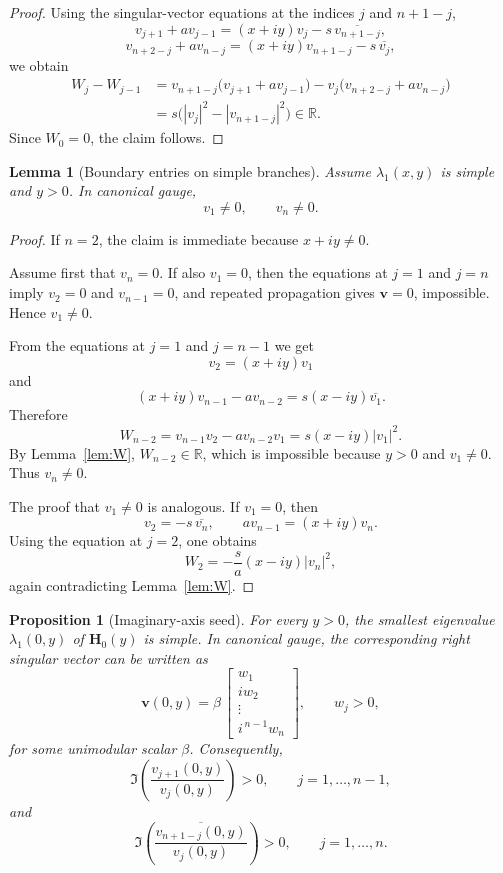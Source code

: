 \documentclass[11pt]{article}
\numberwithin{equation}{section}
\newtheorem{proposition}[theorem]{Proposition}
\newtheorem{lemma}[theorem]{Lemma}
\newcommand{\R}{\mathbb R}
\newcommand{\Hmat}{\mathbf H}
\begin{document}
\begin{proof}
Using the singular-vector equations at the indices \(j\) and \(n+1-j\),
\[
v_{j+1}+av_{j-1}=(x+iy)v_j-s\,\overline{v_{n+1-j}},
\]
\[
v_{n+2-j}+av_{n-j}=(x+iy)v_{n+1-j}-s\,\overline{v_j},
\]
we obtain
\begin{align*}
W_j-W_{j-1}
&=
v_{n+1-j}\bigl(v_{j+1}+av_{j-1}\bigr)
-
v_j\bigl(v_{n+2-j}+av_{n-j}\bigr) \\
&=
s\bigl(|v_j|^2-|v_{n+1-j}|^2\bigr)\in\R.
\end{align*}
Since \(W_0=0\), the claim follows.
\end{proof}

\begin{lemma}[Boundary entries on simple branches]\label{lem:boundary}
Assume \(\lambda_1(x,y)\) is simple and \(y>0\).  In canonical gauge,
\[
v_1\neq0,
\qquad
v_n\neq0.
\]
\end{lemma}

\begin{proof}
If \(n=2\), the claim is immediate because \(x+iy\neq0\).

Assume first that \(v_n=0\).  If also \(v_1=0\), then the equations at \(j=1\) and
\(j=n\) imply \(v_2=0\) and \(v_{n-1}=0\), and repeated propagation gives
\(\bm v=0\), impossible.  Hence \(v_1\neq0\).

From the equations at \(j=1\) and \(j=n-1\) we get
\[
v_2=(x+iy)v_1
\]
and
\[
(x+iy)v_{n-1}-av_{n-2}=s(x-iy)\overline{v_1}.
\]
Therefore
\[
W_{n-2}
=
v_{n-1}v_2-av_{n-2}v_1
=
s(x-iy)|v_1|^2.
\]
By Lemma~\ref{lem:W}, \(W_{n-2}\in\R\), which is impossible because \(y>0\) and
\(v_1\neq0\).  Thus \(v_n\neq0\).

The proof that \(v_1\neq0\) is analogous.  If \(v_1=0\), then
\[
v_2=-s\,\overline{v_n},
\qquad
av_{n-1}=(x+iy)v_n.
\]
Using the equation at \(j=2\), one obtains
\[
W_2
=
-\frac{s}{a}(x-iy)|v_n|^2,
\]
again contradicting Lemma~\ref{lem:W}.
\end{proof}

\begin{proposition}[Imaginary-axis seed]\label{prop:x0}
For every \(y>0\), the smallest eigenvalue \(\lambda_1(0,y)\) of \(\Hmat_0(y)\)
is simple.  In canonical gauge, the corresponding right singular vector can be written
as
\[
\bm v(0,y)
=
\beta\,
\begin{bmatrix}
w_1\\
iw_2\\
\vdots\\
i^{\,n-1}w_n
\end{bmatrix},
\qquad
w_j>0,
\]
for some unimodular scalar \(\beta\).  Consequently,
\[
\Im\!\left(\frac{v_{j+1}(0,y)}{v_j(0,y)}\right)>0,
\qquad
j=1,\dots,n-1,
\]
and
\[
\Im\!\left(\frac{\overline{v_{n+1-j}(0,y)}}{v_j(0,y)}\right)>0,
\qquad
j=1,\dots,n.
\]
\end{proposition}
\end{document}
